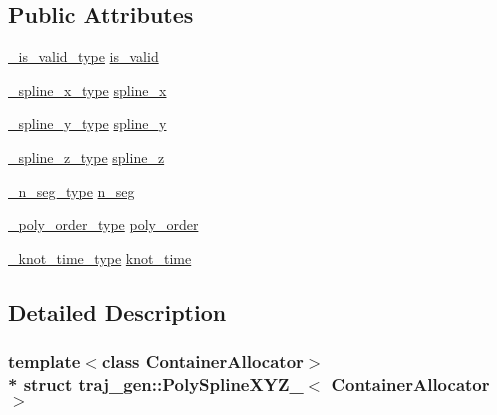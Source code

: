 \subsection*{Public Attributes}
\begin{DoxyCompactItemize}
\item 
\hyperlink{structtraj__gen_1_1_poly_spline_x_y_z___aad18c8f3814cfb1c65ca0a3a068f8327}{\+\_\+is\+\_\+valid\+\_\+type} \hyperlink{structtraj__gen_1_1_poly_spline_x_y_z___a372cfda50d7d422fa234a2f8ebec21ee}{is\+\_\+valid}
\item 
\hyperlink{structtraj__gen_1_1_poly_spline_x_y_z___abc3e93287ad8086e17f90af36bba6f1d}{\+\_\+spline\+\_\+x\+\_\+type} \hyperlink{structtraj__gen_1_1_poly_spline_x_y_z___a0e2ce289d7bb5fbcfe7e436c3c24b3a6}{spline\+\_\+x}
\item 
\hyperlink{structtraj__gen_1_1_poly_spline_x_y_z___aa5c2a1e4f6b1c2bef0e83a02a4850186}{\+\_\+spline\+\_\+y\+\_\+type} \hyperlink{structtraj__gen_1_1_poly_spline_x_y_z___a149445d98f325cd01096a829e4ac90d8}{spline\+\_\+y}
\item 
\hyperlink{structtraj__gen_1_1_poly_spline_x_y_z___ae11b69c7c197072da5371f58b07646b4}{\+\_\+spline\+\_\+z\+\_\+type} \hyperlink{structtraj__gen_1_1_poly_spline_x_y_z___a60e87b9c4f18726568ef29bb43fba580}{spline\+\_\+z}
\item 
\hyperlink{structtraj__gen_1_1_poly_spline_x_y_z___a452de517e162fa10990a02f034732870}{\+\_\+n\+\_\+seg\+\_\+type} \hyperlink{structtraj__gen_1_1_poly_spline_x_y_z___a1315136ffc90e4164123f07aef230a6e}{n\+\_\+seg}
\item 
\hyperlink{structtraj__gen_1_1_poly_spline_x_y_z___a1f81e518c61dd409be0b2456eff1797b}{\+\_\+poly\+\_\+order\+\_\+type} \hyperlink{structtraj__gen_1_1_poly_spline_x_y_z___a868db24a21948436dd8cbe7c71241bc1}{poly\+\_\+order}
\item 
\hyperlink{structtraj__gen_1_1_poly_spline_x_y_z___a64249b19835eb126ff0cad0498fa2cf9}{\+\_\+knot\+\_\+time\+\_\+type} \hyperlink{structtraj__gen_1_1_poly_spline_x_y_z___a3b5c7122e5190c87c753419d12d526b2}{knot\+\_\+time}
\end{DoxyCompactItemize}


\subsection{Detailed Description}
\subsubsection*{template$<$class Container\+Allocator$>$\\*
struct traj\+\_\+gen\+::\+Poly\+Spline\+X\+Y\+Z\+\_\+$<$ Container\+Allocator $>$}



